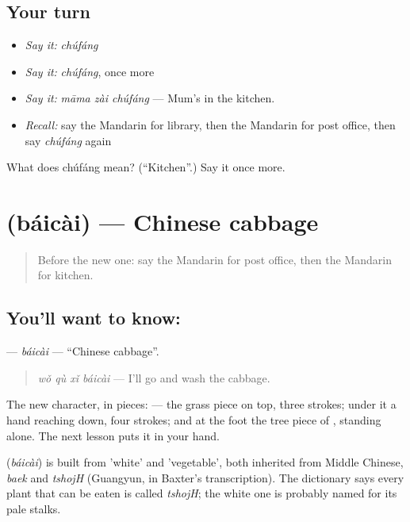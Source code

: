 \subsection*{Your turn}
\begin{itemize}
\raggedright
  \item \emph{Say it:} \emph{chúfáng}
  \item \emph{Say it:} \emph{chúfáng}, once more
  \item \emph{Say it:} \emph{māma zài chúfáng} — Mum's in the kitchen.
  \item \emph{Recall:} say the Mandarin for library, then the Mandarin for post office, then say \emph{chúfáng} again
\end{itemize}

\begin{tcolorbox}[breakable,colback=teal!4,colframe=teal!35!black,title={Before you move on}]
What does chúfáng mean? (\textquotedblleft{}Kitchen\textquotedblright{}.) Say it once more.
\end{tcolorbox}
\section[\texorpdfstring{\zh{白菜} (báicài)}{白菜 (báicài)}]{ (báicài) — Chinese cabbage}

\label{lesson:ZH-C101-baicai}



\begin{quote}
Before the new one: say the Mandarin for post office, then the Mandarin for kitchen.
\end{quote}

\subsection*{You'll want to know: }
\textbf{} — \emph{báicài} — \textquotedblleft{}Chinese cabbage\textquotedblright{}.

\begin{quote}
\textbf{} \emph{wǒ qù xǐ báicài} — I'll go and wash the cabbage.
\end{quote}

The new character, in pieces:  — the grass piece on top, three strokes; under it a hand reaching down, four strokes; and at the foot the tree piece of , standing alone. The next lesson puts it in your hand.

\begin{cousinweb}
\textbf{} (\emph{báicài}) is built from  'white' and  'vegetable', both inherited from Middle Chinese, \emph{baek} and \emph{tshojH} (Guangyun, in Baxter's transcription). The dictionary says every plant that can be eaten is called \emph{tshojH}; the white one is probably named for its pale stalks.
\end{cousinweb}

